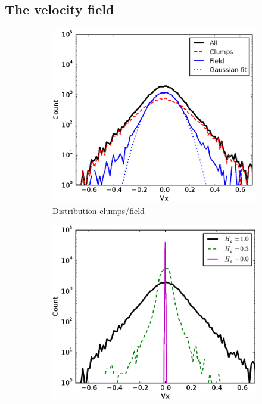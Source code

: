 \subsection{The velocity field}
\label{sec:velocityfield} 




 \begin{figure}
\center
    \centering
    \begin{subfigure}[b]{0.49\textwidth}
    	\centering
    	\includegraphics[width=\textwidth]{Figures/2_Vx_histogram_1}
        \caption{Distribution clumps/field}
        \label{Fig:2_Vx_histogram_1}
    \end{subfigure}
    \begin{subfigure}[b]{0.49\textwidth}
    	\centering
    	\includegraphics[width=\textwidth]{Figures/2_Vx_histogram_2}

\end{subfigure}
\end{figure}
